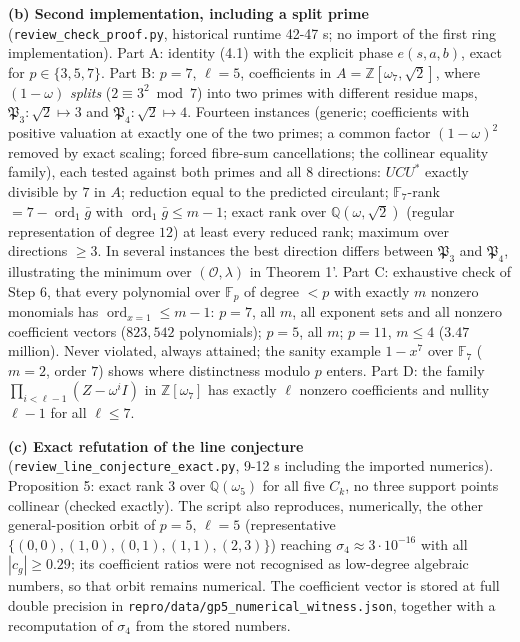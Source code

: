 \documentclass[
  11pt,
  a4paper,
]{article}
\begin{document}
\textbf{(b) Second implementation, including a split prime}
({\small\texttt{review\_\allowbreak{}check\_\allowbreak{}proof.\allowbreak{}py}}, historical runtime 42-47 s; no import
of the first ring implementation). Part A: identity (4.1) with the
explicit phase \(e(s,\allowbreak{}a,\allowbreak{}b)\), exact for \(p\in\{3,\allowbreak{}5,\allowbreak{}7\}\). Part B:
\(p=7\), \(\ell=5\), coefficients in \(A=\mathbb Z[\omega_7,\allowbreak{}\sqrt2]\),
where \((1-\omega)\) \emph{splits} (\(2\equiv3^2\bmod7\)) into two
primes with different residue maps, \(\mathfrak P_3:\sqrt2\mapsto3\) and
\(\mathfrak P_4:\sqrt2\mapsto4\). Fourteen instances (generic;
coefficients with positive valuation at exactly one of the two primes; a
common factor \((1-\omega)^2\) removed by exact scaling; forced
fibre-sum cancellations; the collinear equality family), each tested
against both primes and all \(8\) directions: \(UCU^*\) exactly
divisible by \(7\) in \(A\); reduction equal to the predicted circulant;
\(\mathbb F_7\)-rank \(=7-\operatorname{ord}_1\bar g\) with
\(\operatorname{ord}_1\bar g\le m-1\); exact rank over
\(\mathbb Q(\omega,\allowbreak{}\sqrt2)\) (regular representation of degree \(12\))
at least every reduced rank; maximum over directions \(\ge3\). In
several instances the best direction differs between \(\mathfrak P_3\)
and \(\mathfrak P_4\), illustrating the minimum over
\((\mathcal O,\allowbreak{}\lambda)\) in Theorem 1'. Part C: exhaustive check of Step
6, that every polynomial over \(\mathbb F_p\) of degree \(<p\) with
exactly \(m\) nonzero monomials has \(\operatorname{ord}_{x=1}\le m-1\):
\(p=7\), all \(m\), all exponent sets and all nonzero coefficient
vectors (\(823{,\allowbreak{}}542\) polynomials); \(p=5\), all \(m\); \(p=11\),
\(m\le4\) (\(3.47\) million). Never violated, always attained; the
sanity example \(1-x^7\) over \(\mathbb F_7\) (\(m=2\), order \(7\))
shows where distinctness modulo \(p\) enters. Part D: the family
\(\prod_{i<\ell-1}(Z-\omega^iI)\) in \(\mathbb Z[\omega_7]\) has exactly
\(\ell\) nonzero coefficients and nullity \(\ell-1\) for all
\(\ell\le7\).

\textbf{(c) Exact refutation of the line conjecture}
({\small\texttt{review\_\allowbreak{}line\_\allowbreak{}conjecture\_\allowbreak{}exact.\allowbreak{}py}}, 9-12 s including the
imported numerics). Proposition 5: exact rank \(3\) over
\(\mathbb Q(\omega_5)\) for all five \(C_k\), no three support points
collinear (checked exactly). The script also reproduces, numerically,
the other general-position orbit of \(p=5\), \(\ell=5\) (representative
\(\{(0,\allowbreak{}0),\allowbreak{}(1,\allowbreak{}0),\allowbreak{}(0,\allowbreak{}1),\allowbreak{}(1,\allowbreak{}1),\allowbreak{}(2,\allowbreak{}3)\}\)) reaching
\(\sigma_4\approx3\cdot10^{-16}\) with all \(|c_g|\ge0.29\); its
coefficient ratios were not recognised as low-degree algebraic numbers,
so that orbit remains numerical. The coefficient vector is stored at
full double precision in
{\small\texttt{repro/\allowbreak{}data/\allowbreak{}gp5\_\allowbreak{}numerical\_\allowbreak{}witness.\allowbreak{}json}}, together with a
recomputation of \(\sigma_4\) from the stored numbers.
\end{document}
